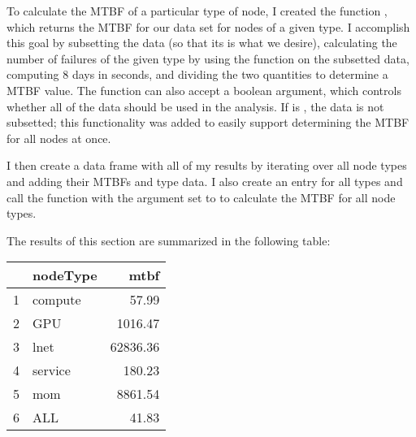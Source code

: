 To calculate the MTBF of a particular type of node, I created the function , which returns the MTBF for our data set for nodes of a given type.  I accomplish this goal by subsetting the data (so that its  is what we desire), calculating the number of failures of the given type by using the  function on the subsetted data, computing 8 days in seconds, and dividing the two quantities to determine a MTBF value.  The function can also accept a boolean  argument, which controls whether all of the data should be used in the analysis.  If  is , the data is not subsetted; this functionality was added to easily support determining the MTBF for all nodes at once.

I then create a data frame with all of my results by iterating over all node types and adding their MTBFs and type data.  I also create an entry for all types and call the  function with the  argument set to  to calculate the MTBF for all node types.

The results of this section are summarized in the following table:

\begin{table}[ht]
\centering
\begin{tabular}{rlr}
  \hline
 & nodeType & mtbf \\ 
  \hline
1 & compute & 57.99 \\ 
  2 & GPU & 1016.47 \\ 
  3 & lnet & 62836.36 \\ 
  4 & service & 180.23 \\ 
  5 & mom & 8861.54 \\ 
  6 & ALL & 41.83 \\ 
   \hline
\end{tabular}
\end{table}
